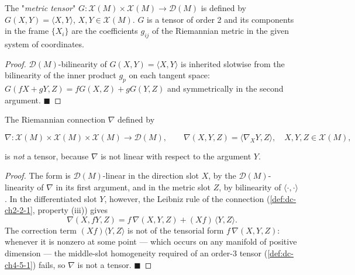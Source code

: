 \begin{example}
  \label{ex:dc-ch4-5-3}
  \leanok
  The "\emph{metric tensor}" $G:\mathcal{X}(M)\times\mathcal{X}(M)\to\mathcal{D}(M)$ is
  defined by $G(X,Y)=\langle X,Y\rangle$, $X,Y\in\mathcal{X}(M)$. $G$ is a tensor of
  order 2 and its components in the frame $\{X_i\}$ are the coefficients $g_{ij}$ of
  the Riemannian metric in the given system of coordinates.
\end{example}
\begin{proof}
  \leanok
  \sketch
  $\mathcal{D}(M)$-bilinearity of $G(X,Y)=\langle X,Y\rangle$ is inherited slotwise
  from the bilinearity of the inner product $g_p$ on each tangent space:
  $G(fX+gY,Z)=fG(X,Z)+gG(Y,Z)$ and symmetrically in the second argument.
  $\blacksquare$
\end{proof}

\begin{example}
  \label{ex:dc-ch4-5-4}
  \leanok
  The Riemannian connection $\nabla$ defined by

  $$
  \nabla:\mathcal{X}(M)\times\mathcal{X}(M)\times\mathcal{X}(M)\to\mathcal{D}(M),\qquad\nabla(X,Y,Z)=\langle\nabla_X Y,Z\rangle,\quad X,Y,Z\in\mathcal{X}(M),
  $$

  is \emph{not} a tensor, because $\nabla$ is not linear with respect to the argument
  $Y$.
\end{example}
\begin{proof}
  \leanok
  \sketch
  The form is $\mathcal{D}(M)$-linear in the direction slot $X$, by the
  $\mathcal{D}(M)$-linearity of $\nabla$ in its first argument, and in the metric
  slot $Z$, by bilinearity of $\langle\cdot,\cdot\rangle$. In the differentiated
  slot $Y$, however, the Leibniz rule of the connection (\cref{def:dc-ch2-2-1},
  property (iii)) gives
  $$
  \nabla(X, fY, Z)=f\,\nabla(X, Y, Z)+(Xf)\,\langle Y, Z\rangle .
  $$
  The correction term $(Xf)\langle Y,Z\rangle$ is not of the tensorial form
  $f\,\nabla(X,Y,Z)$: whenever it is nonzero at some point — which occurs on any
  manifold of positive dimension — the middle-slot homogeneity required of an
  order-$3$ tensor (\cref{def:dc-ch4-5-1}) fails, so $\nabla$ is not a tensor.
  $\blacksquare$
\end{proof}

